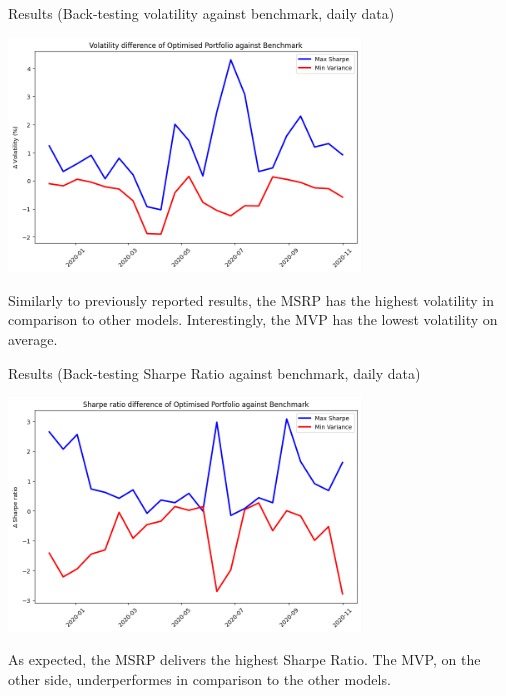 \documentclass{beamer}
\begin{document}
\begin{frame}{Results (Back-testing volatility against benchmark, daily data)}
    \begin{center}
        \includegraphics[width=0.7\textwidth]{Graphics/Volatility difference of Optimised Portfolio against Benchmark.png}
    \end{center}    
\small{Similarly to previously reported results, the MSRP has the highest volatility in comparison to other models. Interestingly, the MVP has the lowest volatility on average.}
\end{frame}

\begin{frame}{Results (Back-testing Sharpe Ratio against benchmark, daily data)}
    \begin{center}
        \includegraphics[width=0.7\textwidth]{Graphics/Sharpe ratio difference of Optimised Portfolio against Benchmark.png}
    \end{center}
\small{As expected, the MSRP delivers the highest Sharpe Ratio. The MVP, on the other side, underperformes in comparison to the other models.}
\end{frame}
\end{document}

